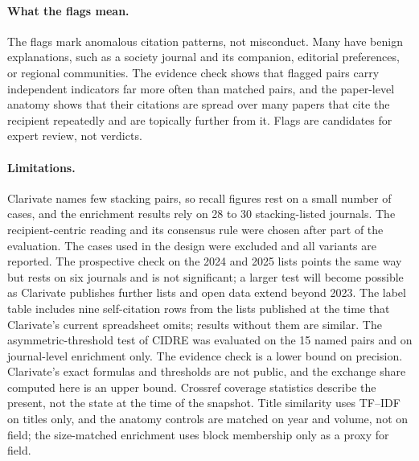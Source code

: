 \paragraph{What the flags mean.}
The flags mark anomalous citation patterns, not misconduct. Many have benign explanations, such as a society journal
and its companion, editorial preferences, or regional communities. The evidence check shows that flagged pairs carry
independent indicators far more often than matched pairs, and the paper-level anatomy shows that their citations are
spread over many papers that cite the recipient repeatedly and are topically further from it. Flags are candidates for
expert review, not verdicts.

\paragraph{Limitations.}
Clarivate names few stacking pairs, so recall figures rest on a small number of cases, and the enrichment results rely
on 28 to 30 stacking-listed journals. The recipient-centric reading and its consensus rule were chosen after part of
the evaluation. The cases used in the design were excluded and all variants are reported. The prospective check on the 2024
and 2025 lists points the same way but rests on six journals and is not significant; a larger test will become possible
as Clarivate publishes further lists and open data extend beyond 2023. The label table includes nine self-citation rows
from the lists published at the time that Clarivate's current spreadsheet omits; results without them are similar.
The asymmetric-threshold test of CIDRE was evaluated on the 15 named pairs and on journal-level enrichment only.
The evidence check is a lower bound on precision. Clarivate's exact formulas and thresholds are not
public, and the exchange share computed here is an upper bound. Crossref coverage statistics describe the present, not the state at
the time of the snapshot. Title similarity uses TF--IDF on titles only, and the anatomy controls are matched on year and volume, not on
field; the size-matched enrichment uses block membership only as a proxy for field.

